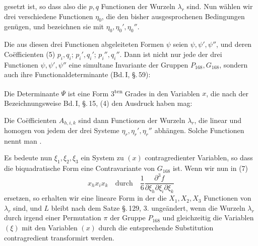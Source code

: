 
gesetzt ist, so dass also die $p, q$ Functionen der Wurzeln $\lambda_r$ sind. Nun wählen wir drei verschiedene Functionen $\eta_0$, die den bisher ausgesprochenen Bedingungen genügen, und bezeichnen sie mit $\eta_0, \eta_0', \eta_0''$.

Die aus diesen drei Functionen abgeleiteten Formen $\psi$ seien $\psi, \psi', \psi''$, und deren Coëfficienten (5) $p_i, q_i$; $p_i', q_i'$; $p_i'', q_i''$. Dann ist nicht nur jede der drei Functionen $\psi, \psi', \psi''$ eine simultane Invariante der Gruppen $P_{168}, G_{168}$, sondern auch ihre Functionaldeterminante (Bd.\,I, \S.\,59):

Die Determinante $\Psi$ ist eine Form 3\textsuperscript{ten} Grades in den Variablen $x$, die nach der Bezeichnungsweise Bd.\,I, \S.\,15, (4) den Ausdruck haben mag:

Die Coëfficienten $A_{h,i,k}$ sind dann Functionen der Wurzeln $\lambda_r$, die linear und homogen von jedem der drei Systeme $\eta_r, \eta_r', \eta_r''$ abhängen. Solche Functionen nennt man .

Es bedeute nun $\xi_1, \xi_2, \xi_3$ ein System zu $(x)$ contragredienter Variablen, so dass die biquadratische Form
eine Contravariante von $G_{168}$ ist. Wenn wir nun in (7)
\[
x_h x_i x_k \quad \text{durch} \quad \frac{1}{6}\frac{\partial^3 f}{\partial\xi_h\partial\xi_i\partial\xi_k}
\]
ersetzen, so erhalten wir eine lineare Form
in der die $X_1, X_2, X_3$ Functionen von $\lambda_r$ sind, und $L$ bleibt nach dem Satze \S.\,129, 3. ungeändert, wenn die Wurzeln $\lambda_r$ durch irgend einer Permutation $\pi$ der Gruppe $P_{168}$ und gleichzeitig die Variablen $(\xi)$ mit den Variablen $(x)$ durch die entsprechende Substitution contragredient transformirt werden. %
